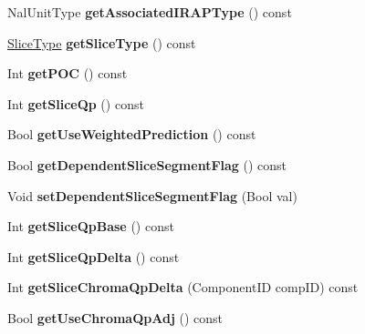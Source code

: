 \begin{DoxyCompactItemize}
Nal\+Unit\+Type {\bfseries get\+Associated\+I\+R\+A\+P\+Type} () const
\item 
\mbox{\label{class_t_com_slice_a2dcdce010ff27c8c3a8d3406fa8695fe}} 
\hyperlink{_type_def_8h_a8fc5fd31653a387f7430d29863620f71}{Slice\+Type} {\bfseries get\+Slice\+Type} () const
\item 
\mbox{\label{class_t_com_slice_abe37c9accf0359d080d0bbc5fb076119}} 
Int {\bfseries get\+P\+OC} () const
\item 
\mbox{\label{class_t_com_slice_ab6d76ea35e24a9c2c23962a6425bea1c}} 
Int {\bfseries get\+Slice\+Qp} () const
\item 
\mbox{\label{class_t_com_slice_a1f71229dbd8ae63ee38f0de168f730d2}} 
Bool {\bfseries get\+Use\+Weighted\+Prediction} () const
\item 
\mbox{\label{class_t_com_slice_a6b9b7c4f89410bbdcc0ef9781e62e5f1}} 
Bool {\bfseries get\+Dependent\+Slice\+Segment\+Flag} () const
\item 
\mbox{\label{class_t_com_slice_ab0a3e19841efd7509aceb1bd8bc49ece}} 
Void {\bfseries set\+Dependent\+Slice\+Segment\+Flag} (Bool val)
\item 
\mbox{\label{class_t_com_slice_a1c0de0092b7f0656b39341dcc02ebeac}} 
Int {\bfseries get\+Slice\+Qp\+Base} () const
\item 
\mbox{\label{class_t_com_slice_a19325f23d409999d96209e1258027e00}} 
Int {\bfseries get\+Slice\+Qp\+Delta} () const
\item 
\mbox{\label{class_t_com_slice_a77493339f9aba5d3610ff74ce6f33b58}} 
Int {\bfseries get\+Slice\+Chroma\+Qp\+Delta} (Component\+ID comp\+ID) const
\item 
\mbox{\label{class_t_com_slice_adadc87cc0578089eed6e019b46cd928c}} 
Bool {\bfseries get\+Use\+Chroma\+Qp\+Adj} () const
\item 
\mbox{\label{class_t_com_slice_a2b1e6369ff8dc363d6e9c3eb4aeeb684}} 

\end{DoxyCompactItemize}
